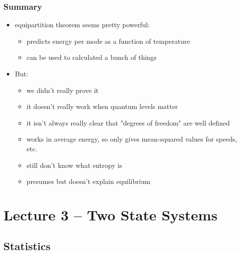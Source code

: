 \documentclass[10pt]{article}
\begin{document}
\subsubsection{Summary}
\begin{itemize}
    \item equipartition theorem seems pretty powerful:
        \begin{itemize}
            \item predicts energy per mode as a function of temperature
            \item can be used to calculated a bunch of things
        \end{itemize}
    \item But:
        \begin{itemize}
            \item we didn't really prove it 
            \item it doesn't really work when quantum levels matter 
            \item it isn't always really clear that "degrees of freedom" are well defined 
            \item works in average energy, so only gives mean-squared values for speeds, etc.
            \item still don't know what entropy is 
            \item presumes but doesn't explain equilibrium
        \end{itemize}
\end{itemize}


\section{Lecture 3 -- Two State Systems}
\subsection{Statistics}
\end{document}
